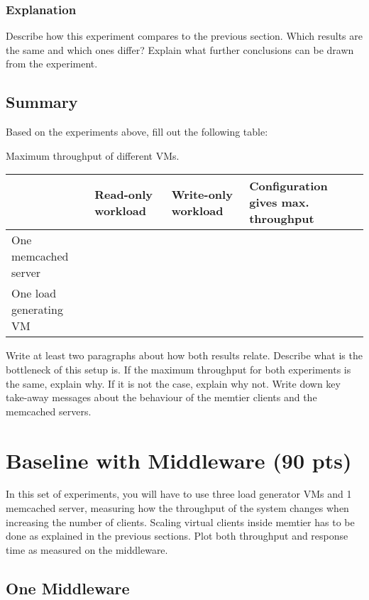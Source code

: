 \documentclass[11pt,a4paper]{article}
\begin{document}
\subsubsection{Explanation}

Describe how this experiment compares to the previous section. Which results are the same and which ones differ? Explain what further conclusions can be drawn from the experiment.


\subsection{Summary}

Based on the experiments above, fill out the following table:

\begin{center}
	{Maximum throughput of different VMs.}
	\begin{tabular}{|l|p{2cm}|p{2cm}|p{4cm}|}
		\hline                        & Read-only workload & Write-only workload & Configuration gives max. throughput \\ 
		\hline One memcached server   &                    &                     &                                     \\ 
		\hline One load generating VM &                    &                     &                                     \\ 
		\hline 
	\end{tabular}
\end{center}


Write at least two paragraphs about how both results relate. Describe what is the bottleneck of this setup is. If the maximum throughput for both experiments is the same, explain why. If it is not the case, explain why not. Write down key take-away messages about the behaviour of the memtier clients and the memcached servers.

\section{Baseline with Middleware (90 pts)}

In this set of experiments, you will have to use three load generator VMs and 1 memcached server, measuring how the throughput of the system changes when increasing the number of clients. Scaling virtual clients inside memtier has to be done as explained in the previous sections. Plot both throughput and response time as measured on the middleware.

\subsection{One Middleware}
\end{document}
